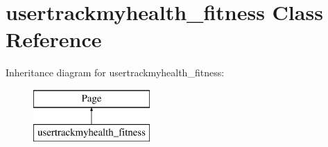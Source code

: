 \hypertarget{classusertrackmyhealth__fitness}{\section{usertrackmyhealth\-\_\-fitness Class Reference}
\label{classusertrackmyhealth__fitness}
}
Inheritance diagram for usertrackmyhealth\-\_\-fitness\-:\begin{figure}[H]
\begin{center}
\leavevmode
\includegraphics[height=2.000000cm]{classusertrackmyhealth__fitness}
\end{center}
\end{figure}
